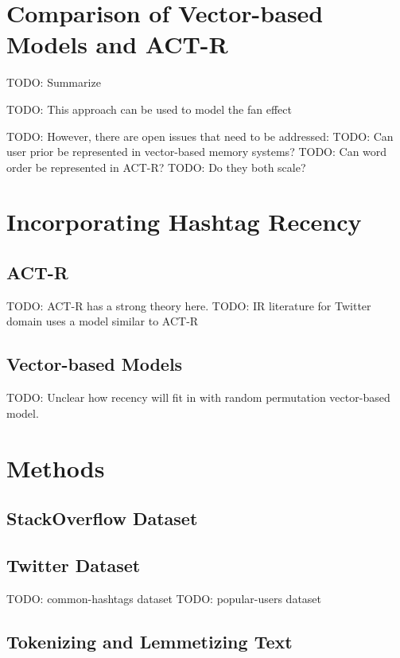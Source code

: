 \documentclass[man]{apa6}
\begin{document}
\section{Comparison of Vector-based Models and ACT-R}

TODO: Summarize \cite{Rutledge2007}

TODO: This approach can be used to model the fan effect \cite{Rutledge2008} 

TODO: However, there are open issues that need to be addressed:
TODO: Can user prior be represented in vector-based memory systems?
TODO: Can word order be represented in ACT-R?
TODO: Do they both scale?

\section{Incorporating Hashtag Recency}

\subsection{ACT-R}

TODO: ACT-R has a strong theory here.
TODO: IR literature for Twitter domain uses a model similar to ACT-R \cite{Efron2011}

\subsection{Vector-based Models}

TODO: Unclear how recency will fit in with random permutation vector-based model.

\section{Methods}

\subsection{StackOverflow Dataset}

\cite{DataDump2013}

\subsection{Twitter Dataset}

TODO: common-hashtags dataset
TODO: popular-users dataset

\subsection{Tokenizing and Lemmetizing Text}
\end{document}
